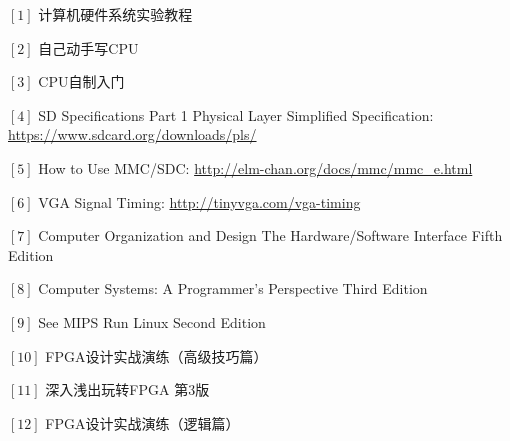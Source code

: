\documentclass[11pt,utf8]{report}
\begin{document}
$[1]$ 计算机硬件系统实验教程 

$[2] $ 自己动手写CPU 

$[3] $ CPU自制入门 

$[4] $ SD Specifications Part 1 Physical Layer Simplified Specification: \url{https://www.sdcard.org/downloads/pls/} 

$[5] $ How to Use MMC/SDC: \url{http://elm-chan.org/docs/mmc/mmc\_e.html} 

$[6] $ VGA Signal Timing: \url{http://tinyvga.com/vga-timing} 

$[7] $ Computer Organization and Design The Hardware/Software Interface Fifth Edition 

$[8] $ Computer Systems: A Programmer's Perspective Third Edition 

$[9] $ See MIPS Run Linux Second Edition 

$[10]$  FPGA设计实战演练（高级技巧篇） 

$[11]$  深入浅出玩转FPGA 第3版 

$[12]$  FPGA设计实战演练（逻辑篇） 
\end{document}

